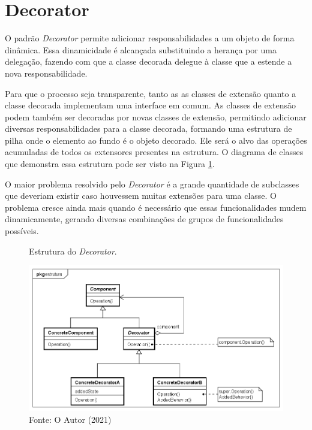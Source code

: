 \section{Decorator}

O padrão \textit{Decorator} permite adicionar responsabilidades a um 
objeto de forma dinâmica. Essa dinamicidade é alcançada 
substituindo a herança por uma delegação, fazendo com 
que a classe decorada delegue à classe que a estende 
a nova responsabilidade.\cite{gamma:1995}

Para que o processo seja transparente, tanto as 
as classes de extensão quanto a classe decorada 
implementam uma interface em comum. As classes 
de extensão podem também ser decoradas por 
novas classes de extensão, permitindo adicionar 
diversas responsabilidades para a classe decorada, 
formando uma estrutura de pilha onde o elemento ao 
fundo é o objeto decorado. Ele será o 
alvo das operações acumuladas de todos os extensores 
presentes na estrutura. O diagrama de classes que 
demonstra essa estrutura pode ser visto na Figura 
\ref{decorator_struct}.

O maior problema resolvido pelo \textit{Decorator} é a grande 
quantidade de subclasses que deveriam existir caso houvessem 
muitas extensões para uma classe. O problema cresce ainda 
mais quando é necessário que essas funcionalidades mudem 
dinamicamente, gerando diversas combinações de grupos de 
funcionalidades possíveis.

\begin{figure}[htb]
	\caption{\label{decorator_struct}Estrutura do \textit{Decorator}.}
	\begin{center}
	    \includegraphics[scale=0.5]{5_padroes-contexto-funcional/5.2_estruturais/5.2.4_decorator/decorator_estrutura.png}
	\end{center}
  \caption*{Fonte: O Autor (2021)}
\end{figure}

